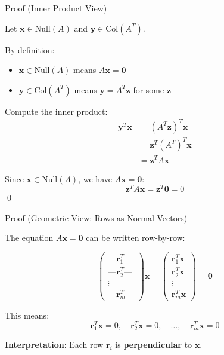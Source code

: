 \documentclass[10pt]{beamer}
\theoremstyle{definition}
\newcommand{\x}[1]{\alert{\textbf{#1}}}
\begin{document}
\begin{frame}{Proof (Inner Product View)}

Let $\mathbf{x} \in \text{Null}(A)$ and $\mathbf{y} \in \text{Col}(A^T)$.

\vspace{1em}

By definition:
\begin{itemize}
\item $\mathbf{x} \in \text{Null}(A)$ means $A\mathbf{x} = \mathbf{0}$
\item $\mathbf{y} \in \text{Col}(A^T)$ means $\mathbf{y} = A^T \mathbf{z}$ for some $\mathbf{z}$
\end{itemize}

\vspace{1em}

Compute the inner product:
\begin{align*}
\mathbf{y}^T \mathbf{x} &= (A^T \mathbf{z})^T \mathbf{x} \\
&= \mathbf{z}^T (A^T)^T \mathbf{x} \\
&= \mathbf{z}^T A \mathbf{x}
\end{align*}

Since $\mathbf{x} \in \text{Null}(A)$, we have $A\mathbf{x} = \mathbf{0}$:
$$\mathbf{z}^T A \mathbf{x} = \mathbf{z}^T \mathbf{0} = 0$$ \qed

\end{frame}

\begin{frame}{Proof (Geometric View: Rows as Normal Vectors)}

The equation $A\mathbf{x} = \mathbf{0}$ can be written row-by-row:

$$\begin{pmatrix} \text{---} \mathbf{r}_1^T \text{---} \\ \text{---} \mathbf{r}_2^T \text{---} \\ \vdots \\ \text{---} \mathbf{r}_m^T \text{---} \end{pmatrix} \mathbf{x} = \begin{pmatrix} \mathbf{r}_1^T \mathbf{x} \\ \mathbf{r}_2^T \mathbf{x} \\ \vdots \\ \mathbf{r}_m^T \mathbf{x} \end{pmatrix} = \mathbf{0}$$

\vspace{1em}

This means:
$$\mathbf{r}_1^T \mathbf{x} = 0, \quad \mathbf{r}_2^T \mathbf{x} = 0, \quad \ldots, \quad \mathbf{r}_m^T \mathbf{x} = 0$$

\vspace{1em}

\x{Interpretation}: Each row $\mathbf{r}_i$ is \x{perpendicular} to $\mathbf{x}$.

\end{frame}
\end{document}
